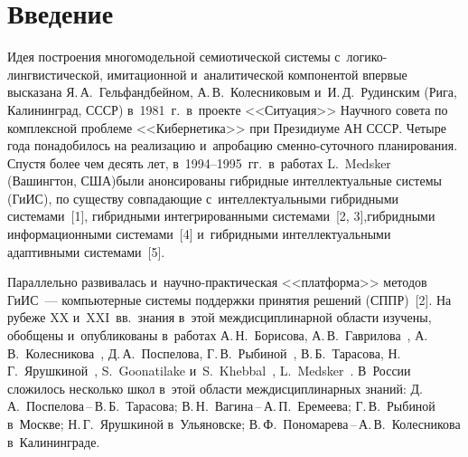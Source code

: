 


\thispagestyle{headings}

\begin{multicols}{2}

\label{st\stat}

\section{Введение}

  Идея построения многомодельной семиотической системы с~логико-лингвистической, 
имитационной и~аналитической компонентой впервые высказана Я.\,А.~Гельфандбейном, 
А.\,В.~Колесниковым и~И.\,Д.~Рудинским (Рига, Калининград, СССР) в~1981~г.\ в~проекте 
<<Ситуация>> Научного совета по комплексной проблеме <<Кибернетика>> при 
Президиуме АН СССР. Четыре года понадобилось на реализацию и~апробацию  
смен\-но-су\-точ\-но\-го планирования. Спустя более чем десять лет, в~1994--1995~гг.\ 
в~работах L.~Medsker (Вашингтон, США)\linebreak были анонсированы гибридные 
интеллектуальные \linebreak 
системы (ГиИС), по существу совпадающие с~интеллектуальными гиб\-рид\-ны\-ми 
системами~[1], гиб\-рид\-ны\-ми интегрированными сис\-те\-ма\-ми~[2, 3],\linebreak гиб\-рид\-ны\-ми 
информационными системами~[4] и~гиб\-рид\-ны\-ми интеллектуальными адаптивными 
сис\-те\-ма\-ми~[5]. 

Параллельно развивалась и~на\-уч\-но-прак\-ти\-че\-ская <<платформа>> 
методов ГиИС~--- компьютерные сис\-те\-мы поддержки 
принятия решений (\mbox{СППР})~[2]. На рубеже XX и~XXI~вв.\ знания в~этой междисциплинарной 
об\-ласти изучены, обобщены и~опубликованы в~работах А.\,Н.~Борисова, 
А.\,В.~Гаврилова~\cite{6-kir}, А.\,В.~Колесникова~\cite{7-kir}, 
Д.\,А.~Поспелова, Г.\,В.~Рыбиной~\cite{3-kir}, В.\,Б.~Тарасова,  
Н.\,Г.~Ярушкиной~\cite{8-kir}, S.~Goonatilake и~S.~Khebbal~\cite{1-kir},  
L.~Medsker~\cite{4-kir}. В~России сложилось несколько школ в~этой об\-ласти 
междисциплинарных знаний: Д.\,А.~Поспелова\,--\,В.\,Б.~Тарасова;  
В.\,Н.~Вагина\,--\,А.\,П.~Еремеева; Г.\,В.~Рыбиной в~Москве; Н.\,Г.~Ярушкиной 
в~Ульяновске; В.\,Ф.~Пономарева\,--\,А.\,В.~Колесникова в~Калининграде. 
  

\end{multicols}
